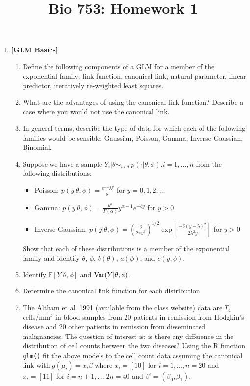 \documentclass[12pt]{article}
\title{Bio 753: Homework 1}
\newcommand{\e}{\mathbb{E}}
\begin{document}
\maketitle
{}

\begin{enumerate}
\item \textbf{[GLM Basics]}

\begin{enumerate}
\item Define the following components of a GLM for a member of the exponential family: link function, canonical link, natural parameter, linear predictor, iteratively re-weighted least squares. 
\item What are the advantages of using the canonical link function? Describe a case where you would not use the canonical link. 
\item In general terms, describe the type of data for which each of the following families would be sensible: Gaussian, Poisson, Gamma, Inverse-Gaussian, Binomial. 
\item Suppose we have a sample $Y_i|\theta \sim_{i.i.d.} p(\cdot | \theta,\phi)$,$i=1,\ldots,n$ from the following distributions: 
\begin{itemize}
\item Poisson: $p(y | \theta,\phi) = \frac{e^{-\lambda} \lambda^y}{y!}$ for $y=0,1,2,\ldots$
\item Gamma: $p(y| \theta,\phi) = \frac{b^{\alpha}}{\Gamma(\alpha)}y^{\alpha-1}e^{-by}$ for $y > 0$
\item Inverse Gaussian: $p(y | \theta, \phi) = \left(\frac{\delta}{2\pi y^3}\right)^{1/2} \exp\left[\frac{-\delta(y-\lambda)^2}{2\lambda^2y}\right]$ for $y > 0$
\end{itemize}
Show that each of these distributions is a member of the exponential family and identify $\theta$, $\phi$, $b(\theta)$, $a(\phi)$, and $c(y,\phi)$. 
\item Identify $\e[Y|\theta,\phi]$ and ${\rm Var}(Y | \theta,\phi)$. 
\item Determine the canonical link function for each distribution
\item The Altham et al. 1991 (available from the class website) data are $T_4$ cells/mm$^3$ in blood samples from 20 patients in remission from Hodgkin's disease and 20 other patients in remission from disseminated malignancies. The question of interest is: is there any difference in the distribution of cell counts between the two diseases? Using the R function {\tt glm()} fit the above models to the cell count data assuming the canonical link with $g(\mu_i)  = x_i \beta$ where $x_i = [1 0]$ for $i = 1,\ldots, n=20$ and $x_i = [1 1]$ for $i = n+1,\ldots,2n=40$ and $\beta' = (\beta_0,\beta_1)$. 

\end{enumerate}
\end{enumerate}
\end{document}
